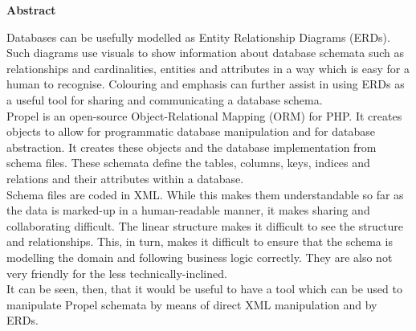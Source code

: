 \thispagestyle{empty}

\begin{center}
    {\LARGE\bf Abstract}
\end{center}

Databases can be usefully modelled as Entity Relationship Diagrams (ERDs). Such diagrams use visuals to show information about database schemata such as relationships and cardinalities, entities and attributes in a way which is easy for a human to recognise. Colouring and emphasis can further assist in using ERDs as a useful tool for sharing and communicating a database schema.
\\

Propel is an open-source Object-Relational Mapping (ORM) for PHP. It creates objects to allow for programmatic database manipulation and for database abstraction. It creates these objects and the database implementation from schema files. These schemata define the tables, columns, keys, indices and relations and their attributes within a database.
\\

Schema files are coded in XML. While this makes them understandable so far as the data is marked-up in a human-readable manner, it makes sharing and collaborating difficult. The linear structure makes it difficult to see the structure and relationships. This, in turn, makes it difficult to ensure that the schema is modelling the domain and following business logic correctly. They are also not very friendly for the less technically-inclined.
\\

It can be seen, then, that it would be useful to have a tool which can be used to manipulate Propel schemata by means of direct XML manipulation and by ERDs.